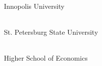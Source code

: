 
\cleardoublepage
{}

\newcommand\partner[3]{ \\ #3}

\partner{height=0.7in}{partners/iu}{Innopolis University}

\partner{height=0.7in}{partners/spbu}{St. Petersburg State University}

\partner{height=0.8in}{partners/hse}{Higher School of Economics}
